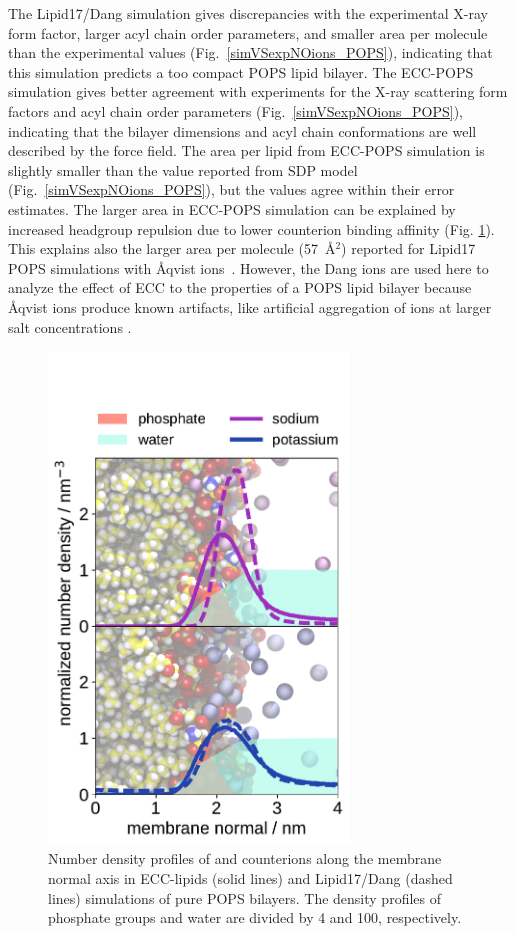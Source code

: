 \documentclass[journal=jpcbfk,manuscript=article]{achemso}
\begin{document}
The Lipid17/Dang simulation gives 
discrepancies with the experimental X-ray form factor,
larger acyl chain order parameters,
and smaller area per molecule than the experimental values (Fig.~\ref{simVSexpNOions_POPS}),
indicating that this simulation predicts a too compact POPS lipid bilayer. 
The ECC-POPS simulation gives better agreement with experiments for the X-ray scattering form factors and 
acyl chain order parameters (Fig.~\ref{simVSexpNOions_POPS}),
indicating that the bilayer dimensions and acyl chain
conformations are well described by the force field. The area per lipid from ECC-POPS simulation is slightly
smaller than the value reported from SDP model \cite{kucerka14} (Fig.~\ref{simVSexpNOions_POPS}), but the values
agree within their error estimates. The larger area in ECC-POPS simulation can be
explained by increased headgroup repulsion due to lower counterion binding affinity (Fig. \ref{fig:POPS-counterions-dens}).
This explains also the larger area per molecule (57~\AA$^2$) reported for Lipid17 POPS simulations
with {\AA}qvist ions~\cite{NMRlipidsIV}.
However, the Dang ions are used here to analyze the effect of ECC to the properties of a POPS lipid bilayer because
{\AA}qvist ions produce known artifacts, like artificial aggregation of ions at larger salt concentrations \cite{kohagen16, chen07, NMRlipidsIV}.

\begin{figure}[hbp!] 
  \centering 
  \includegraphics[width=8cm]{../img/ecc_pops/density_profiles_na-k-counterions_wat_phos_compar_purePOPS_ecclipids-lipid17.pdf}
  \caption{\label{fig:POPS-counterions-dens}
    Number density profiles of  and  counterions along the membrane normal axis
    in ECC-lipids (solid lines) and Lipid17/Dang (dashed lines) simulations of pure POPS bilayers.  
    The density profiles of phosphate groups and water are divided by 4 and 100, respectively.  
  }
\end{figure}
\end{document}

